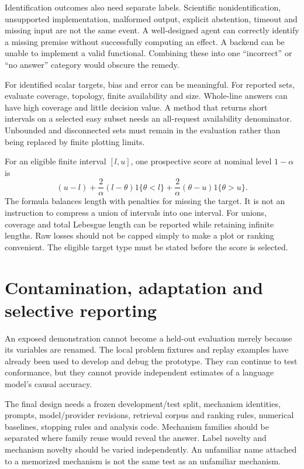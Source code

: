 Identification outcomes also need separate labels. Scientific
nonidentification, unsupported implementation, malformed output, explicit
abstention, timeout and missing input are not the same event. A well-designed
agent can correctly identify a missing premise without successfully computing
an effect. A backend can be unable to implement a valid functional. Combining
these into one ``incorrect'' or ``no answer'' category would obscure the
remedy.

For identified scalar targets, bias and error can be meaningful. For reported
sets, evaluate coverage, topology, finite availability and size. Whole-line
answers can have high coverage and little decision value. A method that
returns short intervals on a selected easy subset needs an all-request
availability denominator. Unbounded and disconnected sets must remain in the
evaluation rather than being replaced by finite plotting limits.

For an eligible finite interval \([l,u]\), one prospective score at nominal
level \(1-\alpha\) is
\[
 (u-l)+\frac{2}{\alpha}(l-\theta)1\{\theta<l\}
       +\frac{2}{\alpha}(\theta-u)1\{\theta>u\}.
\]
The formula balances length with penalties for missing the target. It is
not an instruction to compress a union of intervals into one interval. For
unions, coverage and total Lebesgue length can be reported while retaining
infinite lengths. Raw losses should not be capped simply to make a plot or
ranking convenient. The eligible target type must be stated before the
score is selected.

\section{Contamination, adaptation and selective reporting}

An exposed demonstration cannot become a held-out evaluation merely because
its variables are renamed. The local problem fixtures and replay examples
have already been used to develop and debug the prototype. They can continue
to test conformance, but they cannot provide independent estimates of a
language model's causal accuracy.

The final design needs a frozen development/test split, mechanism identities,
prompts, model/provider revisions, retrieval corpus and ranking rules, numerical
baselines, stopping rules and analysis code. Mechanism families should be
separated where family reuse would reveal the answer. Label novelty and
mechanism novelty should be varied independently. An unfamiliar name attached
to a memorized mechanism is not the same test as an unfamiliar mechanism.

